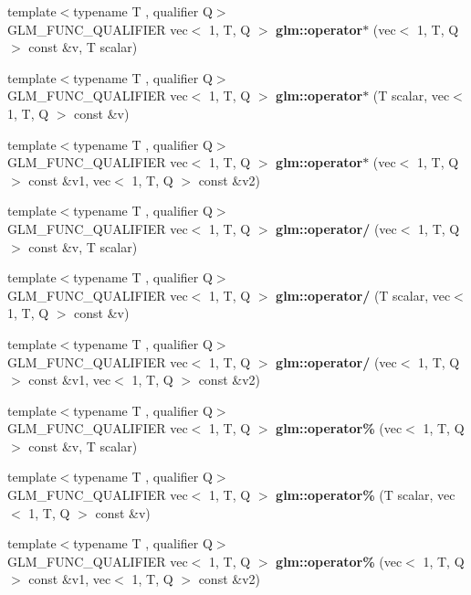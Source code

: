 \begin{DoxyCompactItemize}
\item 
{\footnotesize template$<$typename T , qualifier Q$>$ }\\G\+L\+M\+\_\+\+F\+U\+N\+C\+\_\+\+Q\+U\+A\+L\+I\+F\+I\+ER vec$<$ 1, T, Q $>$ {\bfseries glm\+::operator$\ast$} (vec$<$ 1, T, Q $>$ const \&v, T scalar)
\item 
{\footnotesize template$<$typename T , qualifier Q$>$ }\\G\+L\+M\+\_\+\+F\+U\+N\+C\+\_\+\+Q\+U\+A\+L\+I\+F\+I\+ER vec$<$ 1, T, Q $>$ {\bfseries glm\+::operator$\ast$} (T scalar, vec$<$ 1, T, Q $>$ const \&v)
\item 
{\footnotesize template$<$typename T , qualifier Q$>$ }\\G\+L\+M\+\_\+\+F\+U\+N\+C\+\_\+\+Q\+U\+A\+L\+I\+F\+I\+ER vec$<$ 1, T, Q $>$ {\bfseries glm\+::operator$\ast$} (vec$<$ 1, T, Q $>$ const \&v1, vec$<$ 1, T, Q $>$ const \&v2)
\item 
{\footnotesize template$<$typename T , qualifier Q$>$ }\\G\+L\+M\+\_\+\+F\+U\+N\+C\+\_\+\+Q\+U\+A\+L\+I\+F\+I\+ER vec$<$ 1, T, Q $>$ {\bfseries glm\+::operator/} (vec$<$ 1, T, Q $>$ const \&v, T scalar)
\item 
{\footnotesize template$<$typename T , qualifier Q$>$ }\\G\+L\+M\+\_\+\+F\+U\+N\+C\+\_\+\+Q\+U\+A\+L\+I\+F\+I\+ER vec$<$ 1, T, Q $>$ {\bfseries glm\+::operator/} (T scalar, vec$<$ 1, T, Q $>$ const \&v)
\item 
{\footnotesize template$<$typename T , qualifier Q$>$ }\\G\+L\+M\+\_\+\+F\+U\+N\+C\+\_\+\+Q\+U\+A\+L\+I\+F\+I\+ER vec$<$ 1, T, Q $>$ {\bfseries glm\+::operator/} (vec$<$ 1, T, Q $>$ const \&v1, vec$<$ 1, T, Q $>$ const \&v2)
\item 
{\footnotesize template$<$typename T , qualifier Q$>$ }\\G\+L\+M\+\_\+\+F\+U\+N\+C\+\_\+\+Q\+U\+A\+L\+I\+F\+I\+ER vec$<$ 1, T, Q $>$ {\bfseries glm\+::operator\%} (vec$<$ 1, T, Q $>$ const \&v, T scalar)
\item 
{\footnotesize template$<$typename T , qualifier Q$>$ }\\G\+L\+M\+\_\+\+F\+U\+N\+C\+\_\+\+Q\+U\+A\+L\+I\+F\+I\+ER vec$<$ 1, T, Q $>$ {\bfseries glm\+::operator\%} (T scalar, vec$<$ 1, T, Q $>$ const \&v)
\item 
{\footnotesize template$<$typename T , qualifier Q$>$ }\\G\+L\+M\+\_\+\+F\+U\+N\+C\+\_\+\+Q\+U\+A\+L\+I\+F\+I\+ER vec$<$ 1, T, Q $>$ {\bfseries glm\+::operator\%} (vec$<$ 1, T, Q $>$ const \&v1, vec$<$ 1, T, Q $>$ const \&v2)

\end{DoxyCompactItemize}
